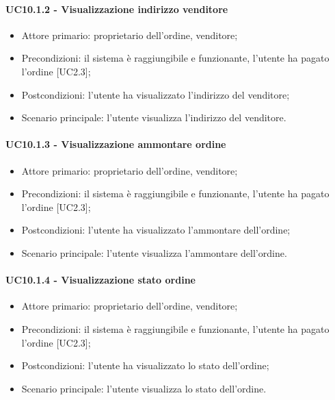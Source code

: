 \paragraph{UC10.1.2 - Visualizzazione indirizzo venditore}

\begin{itemize}
    \item Attore primario: proprietario dell'ordine, venditore;
    \item Precondizioni: il sistema è raggiungibile e funzionante, l'utente ha pagato l'ordine [UC2.3];
    \item Postcondizioni: l'utente ha visualizzato l'indirizzo del venditore;
    \item Scenario principale: l'utente visualizza l'indirizzo del venditore.
\end{itemize}

\paragraph{UC10.1.3 - Visualizzazione ammontare ordine}

\begin{itemize}
    \item Attore primario: proprietario dell'ordine, venditore;
    \item Precondizioni: il sistema è raggiungibile e funzionante, l'utente ha pagato l'ordine [UC2.3];
    \item Postcondizioni: l'utente ha visualizzato l'ammontare dell'ordine;
    \item Scenario principale: l'utente visualizza l'ammontare dell'ordine.
\end{itemize}

\paragraph{UC10.1.4 - Visualizzazione stato ordine}

\begin{itemize}
    \item Attore primario: proprietario dell'ordine, venditore;
    \item Precondizioni: il sistema è raggiungibile e funzionante, l'utente ha pagato l'ordine [UC2.3];
    \item Postcondizioni: l'utente ha visualizzato lo stato dell'ordine;
    \item Scenario principale: l'utente visualizza lo stato dell'ordine.
\end{itemize}

